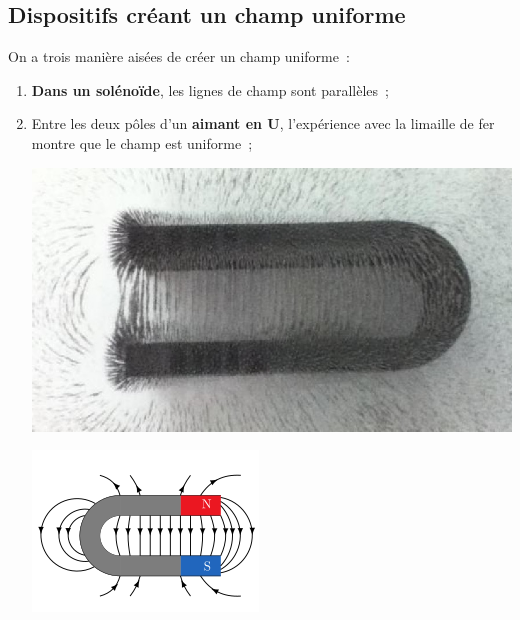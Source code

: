 \documentclass[../../main/main.tex]{subfiles}
\begin{document}
\subsection{Dispositifs créant un champ uniforme}
On a trois manière aisées de créer un champ uniforme~:
\begin{enumerate}
	\item \textbf{Dans un solénoïde}, les lignes de champ sont parallèles~;

	\item Entre les deux pôles d'un \textbf{aimant en U}, l'expérience avec la
	      limaille de fer montre que le champ est uniforme~;
	      \smallbreak
	      \begin{center}
		      \noindent
		      \begin{minipage}[c]{.45\linewidth}
			      \centering
			      \includegraphics[scale=1,rotate=180]{aimu_lim.jpg}
		      \end{minipage}
		      \hfill
		      \begin{minipage}[c]{.45\linewidth}
			      \centering
			      \includegraphics[scale=1]{aimu_sch}
		      \end{minipage}
		      \label{fig:aimu}
	      \end{center}


\end{enumerate}
\end{document}
